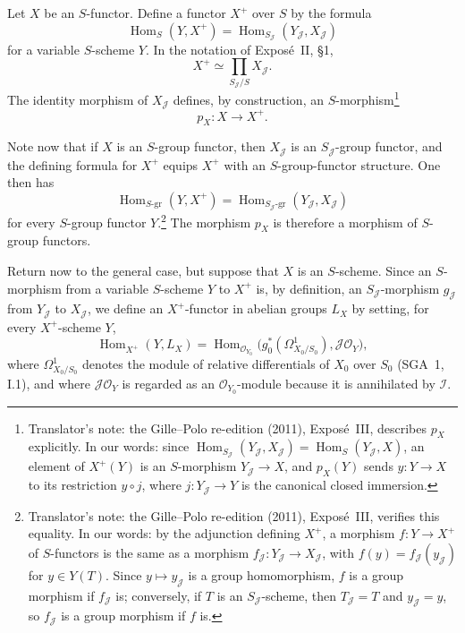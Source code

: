 Let \(X\) be an \(S\)-functor. Define a functor \(X^+\) over
\(S\) by the formula
\[
 \operatorname{Hom}_S(Y,X^+)
 =\operatorname{Hom}_{S_{\mathscr J}}
    (Y_{\mathscr J},X_{\mathscr J})
\]
for a variable \(S\)-scheme \(Y\). In the notation of
Expos\'e~II, \S1,
\[
 X^+\simeq\prod_{S_{\mathscr J}/S}X_{\mathscr J}.
\]
The identity morphism of \(X_{\mathscr J}\) defines, by construction, an
\(S\)-morphism\footnote{Translator's note: the Gille--Polo re-edition (2011), Exposé~III, describes \(p_X\) explicitly. In our
words: since \(\operatorname{Hom}_{S_{\mathscr J}}(Y_{\mathscr J},X_{\mathscr J})
=\operatorname{Hom}_S(Y_{\mathscr J},X)\), an element of \(X^+(Y)\) is an
\(S\)-morphism \(Y_{\mathscr J}\to X\), and \(p_X(Y)\) sends
\(y\colon Y\to X\) to its restriction \(y\circ j\), where
\(j\colon Y_{\mathscr J}\to Y\) is the canonical closed immersion.}
\[
 p_X:X\longrightarrow X^+.
\]

Note now that if \(X\) is an \(S\)-group functor, then
\(X_{\mathscr J}\) is an \(S_{\mathscr J}\)-group functor, and the defining
formula for \(X^+\) equips \(X^+\) with an \(S\)-group-functor structure.
One then has
\[
 \operatorname{Hom}_{S\text{-}\mathrm{gr}}(Y,X^+)
 =
 \operatorname{Hom}_{S_{\mathscr J}\text{-}\mathrm{gr}}
   (Y_{\mathscr J},X_{\mathscr J})
\]
for every \(S\)-group functor \(Y\).\footnote{Translator's note: the Gille--Polo re-edition (2011), Exposé~III, verifies this
equality. In our words: by the adjunction defining \(X^+\), a morphism
\(f\colon Y\to X^+\) of \(S\)-functors is the same as a morphism
\(f_{\mathscr J}\colon Y_{\mathscr J}\to X_{\mathscr J}\), with
\(f(y)=f_{\mathscr J}(y_{\mathscr J})\) for \(y\in Y(T)\). Since
\(y\mapsto y_{\mathscr J}\) is a group homomorphism, \(f\) is a group
morphism if \(f_{\mathscr J}\) is; conversely, if \(T\) is an
\(S_{\mathscr J}\)-scheme, then \(T_{\mathscr J}=T\) and
\(y_{\mathscr J}=y\), so \(f_{\mathscr J}\) is a group morphism if \(f\)
is.} The morphism \(p_X\) is therefore a morphism of \(S\)-group functors.

Return now to the general case, but suppose that \(X\) is an
\(S\)-scheme. Since an \(S\)-morphism from a variable \(S\)-scheme \(Y\) to
\(X^+\) is, by definition, an \(S_{\mathscr J}\)-morphism
\(g_{\mathscr J}\) from \(Y_{\mathscr J}\) to \(X_{\mathscr J}\), we define an
\(X^+\)-functor in abelian groups \(L_X\) by setting, for every
\(X^+\)-scheme \(Y\),
\[
 \operatorname{Hom}_{X^+}(Y,L_X)
 =
 \operatorname{Hom}_{\mathscr O_{Y_0}}
 \bigl(g_0^*(\Omega^1_{X_0/S_0}),\mathscr J\mathscr O_Y\bigr),
\]
where \(\Omega^1_{X_0/S_0}\) denotes the module of relative differentials
of \(X_0\) over \(S_0\) (SGA~1, I.1), and where \(\mathscr J\mathscr O_Y\) is
regarded as an \(\mathscr O_{Y_0}\)-module because it is annihilated by
\(\mathscr I\).

